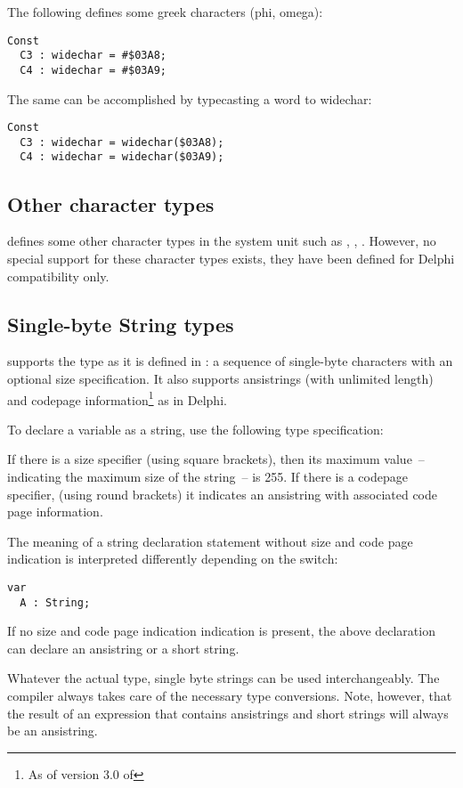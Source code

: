 The following defines some greek characters (phi, omega):
\begin{verbatim}
Const
  C3 : widechar = #$03A8;
  C4 : widechar = #$03A9;
\end{verbatim}
The same can be accomplished by typecasting a word to widechar:
\begin{verbatim}
Const
  C3 : widechar = widechar($03A8);
  C4 : widechar = widechar($03A9);
\end{verbatim}

\subsection{Other character types}
\fpc defines some other character types in the system unit such as
, , .
However, no special support for these character types exists, they have been
defined for Delphi compatibility only.

\subsection{Single-byte String types}
 
\fpc supports the  type as it is defined in \tp:
a sequence of single-byte characters with an optional size specification.
It also supports ansistrings (with unlimited length) and codepage information\footnote{As of version 3.0 of \fpc} as in Delphi.

To declare a variable as a string, use the following type specification:

If there is a size specifier (using square brackets), then its maximum value~-- indicating the maximum
size of the string~-- is 255. If there is a codepage specifier, (using round brackets) it indicates an
ansistring with associated code page information.

The meaning of a string declaration statement without size and code page indication is
interpreted differently depending on the  switch:
\begin{verbatim}
var
  A : String;
\end{verbatim}
If no size and code page indication indication is present, the above declaration can declare
an ansistring or a short string.

Whatever the actual type, single byte strings can be used interchangeably.
The compiler always takes care of the necessary type conversions.
Note, however, that the result of an expression that contains ansistrings and short strings will always be an ansistring.

